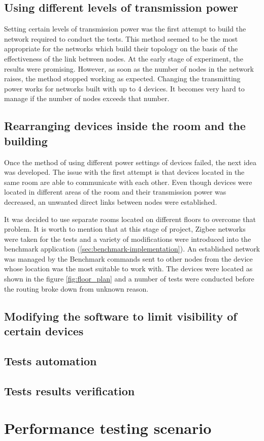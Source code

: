 \subsection*{Using different levels of transmission power}
Setting certain levels of transmission power was the first attempt
to build the network required to conduct the tests. This method seemed to be the
most appropriate for the networks which build their topology on the basis of
the effectiveness of the link between nodes. At the early stage of experiment,
the results were promising. However, as soon as the number of nodes in the 
network raises, the method stopped working as expected. Changing the 
transmitting power works for networks built with up to 4 devices. It becomes
very hard to manage if the number of nodes exceeds that number.

\subsection*{Rearranging devices inside the room and the building}
Once the method of using different power settings of devices failed, the next
idea was developed. The issue with the first attempt is that devices located
in the same room are able to communicate with each other. Even though devices
were located in different areas of the room and their transmission power was
decreased, an unwanted direct links between nodes were established.

It was decided to use separate rooms located on different floors to overcome
that problem. It is worth to mention that at this stage of project, Zigbee 
networks were taken for the tests and a variety of modifications were introduced
into the benchmark application (\ref{sec:benchmark-implementation}). An 
established network was managed by the Benchmark commands sent to other nodes
from the device whose location was the most suitable to work with. The devices
were located as shown in the figure \ref{fig:floor_plan} and a number of
tests were conducted before the routing broke down from unknown reason.

\subsection*{Modifying the software to limit visibility of certain devices}


\subsection{Tests automation}

\subsection{Tests results verification}


\medskip
\section{Performance testing scenario}
\label{sec:performance-testing-scenario}
